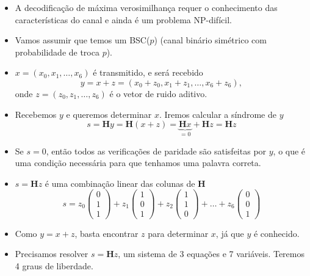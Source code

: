 \begin{frame}[allowframebreaks]
  \begin{itemize}
  \item A decodificação de máxima verosimilhança requer o conhecimento das características do canal
	e ainda é um problema NP-difícil.
  \item Vamos assumir que temos um BSC($p$) (canal binário simétrico com probabilidade de troca $p$).
  \item $x = (x_0, x_1, \ldots, x_6)$ é transmitido, e será recebido
	\begin{equation}
	y = x + z = (x_0 + z_0, x_1 + z_1, \ldots, x_6 + z_6) ,
	\end{equation}
	onde $z = (z_0, z_1, \ldots, z_6)$ é o vetor de ruido aditivo.
  \item Recebemos $y$ e queremos determinar $x$. Iremos calcular a síndrome de $y$
	\begin{equation}
	s = \mathbf{H} y = \mathbf{H} (x+z) = \underbrace{\mathbf{H} x}_{=0} + \mathbf{H} z = \mathbf{H} z
	\end{equation}
  \item Se $s=0$, então todos as verificações de paridade são satisfeitas por $y$, o que é uma condição 
	necessária para que tenhamos uma palavra correta.
  \item $s = \mathbf{H} z$ é uma combinação linear das colunas de $\mathbf{H}$
	\begin{equation}
	s = z_0 \begin{pmatrix} 0 \\ 1 \\ 1 \end{pmatrix} + z_1 \begin{pmatrix} 1 \\ 0 \\ 1 \end{pmatrix} + z_2 \begin{pmatrix} 1 \\ 1 \\ 0 \end{pmatrix} + \ldots + z_6 \begin{pmatrix} 0 \\ 0 \\ 1 \end{pmatrix}
	\end{equation}
  \item Como $y=x+z$, basta encontrar $z$ para determinar $x$, já que $y$ é conhecido.
  \item Precisamos resolver $s = \mathbf{H} z$, um sistema de 3 equações e 7 variáveis. Teremos 4 graus de liberdade.

\end{itemize}
\end{frame}
